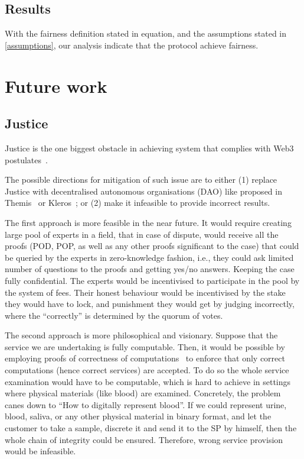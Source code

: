 \documentclass{ieeeaccess}
\begin{document}
\subsection{Results}\label{results}

With the fairness definition stated in equation, and the assumptions
stated in \ref{assumptions}, our analysis indicate that the protocol
achieve fairness.



\section{Future work}\label{future-work}
\subsection{Justice}\label{justice}

Justice is the one biggest obstacle in achieving system that complies with Web3 postulates~\cite{Web3Wiki71}.

The possible directions for mitigation of such issue are to either (1)
replace Justice with decentralised autonomous organisations (DAO) like
proposed in Themis~\cite{meng2019themis} or
Kleros~\cite{lesaege2018kleros}; or (2) make it infeasible to provide
incorrect results.

The first approach is more feasible in the near future. It would require
creating large pool of experts in a field, that in case of dispute,
would receive all the proofs (POD, POP, as well as any other proofs
significant to the case) that could be queried by the experts in
zero-knowledge fashion, i.e., they could ask limited number of questions
to the proofs and getting yes/no answers. Keeping the case fully
confidential. The experts would be incentivised to participate in the
pool by the system of fees. Their honest behaviour would be incentivised
by the stake they would have to lock, and punishment they would get by
judging incorrectly, where the ``correctly'' is determined by the quorum
of votes.

The second approach is more philosophical and visionary. Suppose that
the service we are undertaking is fully computable. Then, it would be
possible by employing proofs of correctness of
computations~\cite{ben2013snarks} to enforce that only correct
computations (hence correct services) are accepted. To do so the whole
service examination would have to be computable, which is hard to
achieve in settings where physical materials (like blood) are examined.
Concretely, the problem canes down to ``How to digitally represent
blood''. If we could represent urine, blood, saliva, or any other
physical material in binary format, and let the customer to take a
sample, discrete it and send it to the SP by himself, then the whole
chain of integrity could be ensured. Therefore, wrong service provision
would be infeasible.
\end{document}
